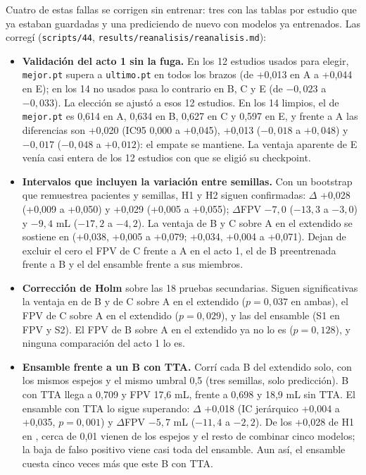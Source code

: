 Cuatro de estas fallas se corrigen sin entrenar: tres con las tablas por estudio que ya estaban guardadas y una prediciendo de nuevo con modelos ya entrenados. Las corregí (\texttt{scripts/44}, \texttt{results/reanalisis/reanalisis.md}):

\begin{itemize}
\item \textbf{Validación del acto 1 sin la fuga.} En los 12 estudios usados para elegir, \texttt{mejor.pt} supera a \texttt{ultimo.pt} en todos los brazos (de +0,013 en A a +0,044 en E); en los 14 no usados pasa lo contrario en B, C y E (de $-0{,}023$ a $-0{,}033$). La elección se ajustó a esos 12 estudios. En los 14 limpios, el \dmas{} de \texttt{mejor.pt} es 0,614 en A, 0,634 en B, 0,627 en C y 0,597 en E, y frente a A las diferencias son +0,020 (IC95 0,000 a +0,045), +0,013 ($-0{,}018$ a $+0{,}048$) y $-0{,}017$ ($-0{,}048$ a $+0{,}012$): el empate se mantiene. La ventaja aparente de E venía casi entera de los 12 estudios con que se eligió su checkpoint.
\item \textbf{Intervalos que incluyen la variación entre semillas.} Con un bootstrap que remuestrea pacientes y semillas, H1 y H2 siguen confirmadas: $\Delta$\dmas{} +0,028 (+0,009 a +0,050) y +0,029 (+0,005 a +0,055); $\Delta$FPV $-7{,}0$ ($-13{,}3$ a $-3{,}0$) y $-9{,}4$ mL ($-17{,}2$ a $-4{,}2$). La ventaja de B y C sobre A en el extendido se sostiene en \dmas{} (+0,038, +0,005 a +0,079; +0,034, +0,004 a +0,071). Dejan de excluir el cero el FPV de C frente a A en el acto 1, el de B preentrenada frente a B y el del ensamble frente a sus miembros.
\item \textbf{Corrección de Holm} sobre las 18 pruebas secundarias. Siguen significativas la ventaja en \dmas{} de B y de C sobre A en el extendido ($p=0{,}037$ en ambas), el FPV de C sobre A en el extendido ($p=0{,}029$), y las del ensamble (S1 en FPV y S2). El FPV de B sobre A en el extendido ya no lo es ($p=0{,}128$), y ninguna comparación del acto 1 lo es.
\item \textbf{Ensamble frente a un B con TTA.} Corrí cada B del extendido solo, con los mismos espejos y el mismo umbral 0,5 (tres semillas, solo predicción). B con TTA llega a \dmas{} 0,709 y FPV 17,6 mL, frente a 0,698 y 18,9 mL sin TTA. El ensamble con TTA lo sigue superando: $\Delta$\dmas{} +0,018 (IC jerárquico +0,004 a +0,035, $p=0{,}001$) y $\Delta$FPV $-5{,}7$ mL ($-11{,}4$ a $-2{,}2$). De los +0,028 de H1 en \dmas{}, cerca de 0,01 vienen de los espejos y el resto de combinar cinco modelos; la baja de falso positivo viene casi toda del ensamble. Aun así, el ensamble cuesta cinco veces más que este B con TTA.
\end{itemize}

